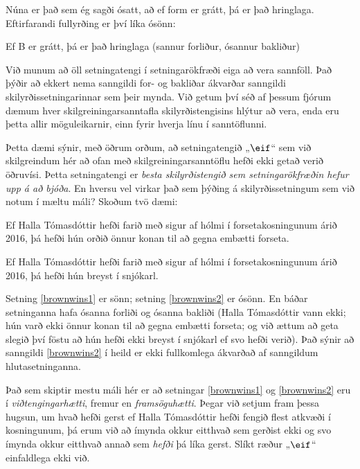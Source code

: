 \begin{center}
\end{center}
Núna er það sem ég sagði ósatt, að ef form er grátt, þá er það hringlaga. Eftirfarandi fullyrðing er því líka ósönn:
	\begin{ebullet}
		\item Ef B er grátt, þá er það hringlaga \hfill (sannur forliður, ósannur bakliður)
	\end{ebullet}
Við munum að öll setningatengi í setningarökfræði eiga að vera sannföll. Það þýðir að ekkert nema sanngildi for- og bakliðar ákvarðar sanngildi skilyrðissetningarinnar sem þeir mynda. Við getum því séð af þessum fjórum dæmum hver skilgreiningarsanntafla skilyrðistengisins hlýtur að vera, enda eru þetta allir möguleikarnir, einn fyrir hverja línu í sanntöflunni. 
	
Þetta dæmi sýnir, með öðrum orðum, að setningatengið „$\eif$“ sem við skilgreindum hér að ofan með skilgreiningarsanntöflu hefði ekki getað verið öðruvísi. Þetta setningatengi er \emph{besta skilyrðistengið sem setningarökfræðin hefur upp á að bjóða}. En hversu vel virkar það sem þýðing á skilyrðissetningum sem við notum í mæltu máli? Skoðum tvö dæmi:
	\begin{earg}
		\item[\ex{brownwins1}] Ef Halla Tómasdóttir hefði farið með sigur af hólmi í forsetakosningunum árið 2016, þá hefði hún orðið önnur konan til að gegna embætti forseta.
		\item[\ex{brownwins2}] Ef Halla Tómasdóttir hefði farið með sigur af hólmi í forsetakosningunum árið 2016, þá hefði hún breyst í snjókarl.
	\end{earg}
Setning \ref{brownwins1} er sönn; setning \ref{brownwins2} er ósönn. En báðar setninganna hafa ósanna forliði og ósanna bakliði (Halla Tómasdóttir vann ekki; hún varð ekki önnur konan til að gegna embætti forseta; og við ættum að geta slegið því föstu að hún hefði ekki breyst í snjókarl ef svo hefði verið). Það sýnir að sanngildi \ref{brownwins2} í heild er ekki fullkomlega ákvarðað af sanngildum hlutasetninganna.

Það sem skiptir mestu máli hér er að setningar \ref{brownwins1} og \ref{brownwins2} eru í \emph{viðtengingarhætti}, fremur en \emph{framsöguhætti}. Þegar við setjum fram þessa hugsun, um hvað hefði gerst ef Halla Tómasdóttir hefði fengið flest atkvæði í kosningunum, þá erum við að ímynda okkur eitthvað sem gerðist ekki og svo ímynda okkur eitthvað annað sem \emph{hefði} þá líka gerst. Slíkt ræður „$\eif$“ einfaldlega ekki við.

